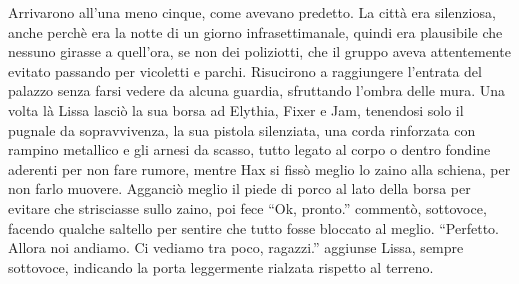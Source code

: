     Arrivarono all'una meno cinque, come avevano predetto. La città era
    silenziosa, anche perchè era la notte di un giorno infrasettimanale,
    quindi era plausibile che nessuno girasse a quell'ora, se non dei
    poliziotti, che il gruppo aveva attentemente evitato passando per
    vicoletti e parchi. Risucirono a raggiungere l'entrata del palazzo
    senza farsi vedere da alcuna guardia, sfruttando l'ombra delle mura.
    Una volta là Lissa lasciò la sua borsa ad Elythia, Fixer e Jam,
    tenendosi solo il pugnale da sopravvivenza, la sua pistola silenziata,
    una corda rinforzata con rampino metallico e gli arnesi da scasso,
    tutto legato al corpo o dentro fondine aderenti per non fare rumore, mentre
    Hax si fissò meglio lo zaino alla schiena, per non farlo muovere.
    Agganciò meglio il piede di porco al lato della borsa per evitare che
    strisciasse sullo zaino, poi fece ``Ok, pronto.'' commentò, sottovoce, facendo qualche
    saltello per sentire che tutto fosse bloccato al meglio. ``Perfetto.
    Allora noi andiamo. Ci vediamo tra poco, ragazzi.'' aggiunse Lissa,
    sempre sottovoce, indicando la porta leggermente rialzata rispetto al
    terreno.

